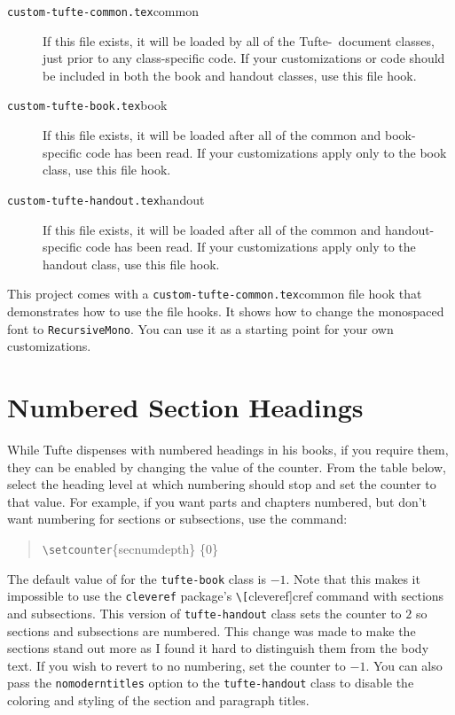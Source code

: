 \documentclass[a4paper]{tufte-handout}
\newcommand{\TL}{Tufte-\hologo{LaTeX}\xspace}
\newcommand{\hlorange}[1]{\textcolor{tufte-orange}{#1}}
\newcommand{\doccmd}[1]{\hlorange{\texttt{\textbackslash#1}}}
\newcommand{\docpkg}[1]{\hlorange{\texttt{#1}}}
\newcommand{\doccls}[1]{\texttt{#1}}
\newcommand{\docclsopt}[1]{\hlorange{\texttt{#1}}}
\newcommand{\docfilehook}[1]{\texttt{#1}}
\newenvironment{docspec}
  {\begin{quotation}\ttfamily\parskip0pt\parindent0pt\ignorespaces}
  {\end{quotation}}
\begin{document}
\begin{description}
  \item[\docfilehook{custom-tufte-common.tex}{common}]
    If this file exists, it will be loaded by all of the \TL\ document classes, just prior to any class-specific code. If your customizations or code should be included in both the book and handout classes, use this file hook.
  \item[\docfilehook{custom-tufte-book.tex}{book}] 
    If this file exists, it will be loaded after all of the common and book-specific code has been read. 
    If your customizations apply only to the book class, use this file hook.
  \item[\docfilehook{custom-tufte-handout.tex}{handout}] 
    If this file exists, it will be loaded after all of the common and handout-specific code has been read.
    If your customizations apply only to the handout class, use this file hook.
\end{description}%

This project comes with a \docfilehook{custom-tufte-common.tex}{common} file hook that demonstrates how to use the file hooks.
It shows how to change the monospaced font to \texttt{RecursiveMono}.
You can use it as a starting point for your own customizations.


\section{Numbered Section Headings}\label{sec:numbered-sections}%
While Tufte dispenses with numbered headings in his books, if you require them, they can be enabled by changing the value of the counter. 
From the table below, select the heading level at which numbering should stop and set the  counter to that value.
For example, if you want parts and chapters numbered, but don't want numbering for sections or subsections, use the command:
\begin{docspec}
  \doccmd{setcounter}\{secnumdepth\} \{0\}
\end{docspec}

The default value of  for the \doccls{tufte-book} class is \(-1\).
Note that this makes it impossible to use the \docpkg{cleveref} package's \doccmd[cleveref]{cref} command with sections and subsections.
This version of \doccls{tufte-handout} class sets the counter to \(2\) so sections and subsections are numbered.
This change was made to make the sections stand out more as I found it hard to distinguish them from the body text.
If you wish to revert to no numbering, set the counter to \(-1\).
You can also pass the \docclsopt{nomoderntitles} option to the \doccls{tufte-handout} class to disable the coloring and styling of the section and paragraph titles.
\end{document}
